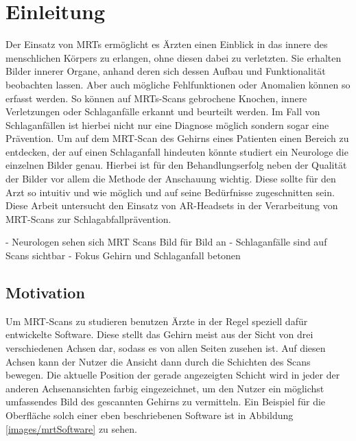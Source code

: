 
\chapter{Einleitung}

Der Einsatz von MRTs ermöglicht es Ärzten einen Einblick in das innere des menschlichen Körpers zu erlangen, ohne diesen dabei zu verletzten. Sie erhalten Bilder innerer Organe, anhand deren sich dessen Aufbau und Funktionalität beobachten lassen. Aber auch mögliche Fehlfunktionen oder Anomalien können so erfasst werden. So können auf MRTs-Scans gebrochene Knochen, innere Verletzungen oder Schlaganfälle erkannt und beurteilt werden. Im Fall von Schlaganfällen ist hierbei nicht nur eine Diagnose möglich sondern sogar eine Prävention. 
Um auf dem MRT-Scan des Gehirns eines Patienten einen Bereich zu entdecken, der auf einen Schlaganfall hindeuten könnte studiert ein Neurologe die einzelnen Bilder genau. Hierbei ist für den Behandlungserfolg neben der Qualität der Bilder vor allem die Methode der Anschauung wichtig. Diese sollte für den Arzt so intuitiv und wie möglich und auf seine Bedürfnisse zugeschnitten sein. 
Diese Arbeit untersucht den Einsatz von AR-Headsets in der Verarbeitung von MRT-Scans zur Schlagabfallprävention.

- Neurologen sehen sich MRT Scans Bild für Bild an
- Schlaganfälle sind auf Scans sichtbar
- Fokus Gehirn und Schlaganfall betonen

\section{Motivation}
\label{motivation}

Um MRT-Scans zu studieren benutzen Ärzte in der Regel speziell dafür entwickelte Software. Diese stellt das Gehirn meist aus der Sicht von drei verschiedenen Achsen dar, sodass es von allen Seiten zusehen ist. Auf diesen Achsen kann der Nutzer die Ansicht dann durch die Schichten des Scans bewegen. Die aktuelle Position der gerade angezeigten Schicht wird in jeder der anderen Achsenansichten farbig eingezeichnet, um den Nutzer ein möglichst umfassendes Bild des gescannten Gehirns zu vermitteln. 
Ein Beispiel für die Oberfläche solch einer eben beschriebenen Software ist in Abbildung \ref{images/mrtSoftware} zu sehen. 

